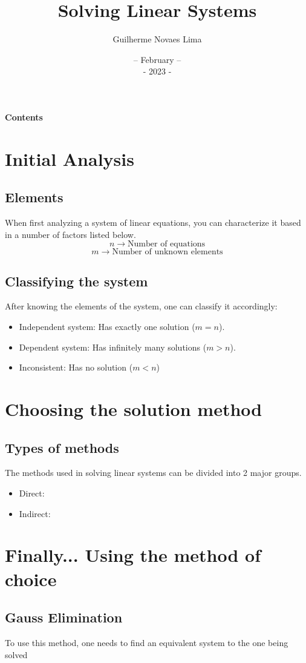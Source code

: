 \documentclass{article}
\title{Solving Linear Systems}
\author{Guilherme Novaes Lima}
\date{--  February  --\\-  2023  -}
\begin{document}
\maketitle
\pagebreak
\begin{center}
\textbf{\Large Contents}
\end{center}
\renewcommand{\contentsname}{}
\vspace*{\fill}
\tableofcontents
\vspace*{\fill}
\pagebreak
\section{Initial Analysis}
\subsection{Elements}
When first analyzing a system of linear equations, you can characterize it based in a number of factors listed below.
\[n \rightarrow \text{Number of equations}\]
\[m \rightarrow \text{Number of unknown elements}\]
\subsection{Classifying the system}
After knowing the elements of the system, one can classify it accordingly:
\begin{itemize}
    \item Independent system: Has exactly one solution ($m = n$).
    \item Dependent system: Has infinitely many solutions ($m > n$).
    \item Inconsistent: Has no solution ($m < n$) 
\end{itemize}
\section{Choosing the solution method}
\subsection{Types of methods}
The methods used in solving linear systems can be divided into 2 major groups.
\begin{itemize}
    \item Direct: 
    \item Indirect:
\end{itemize}
\section{Finally... Using the method of choice}
\subsection{Gauss Elimination}
To use this method, one needs to find an equivalent system to the one being solved 
\end{document}
